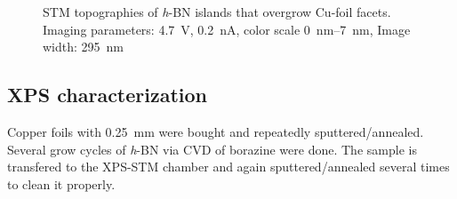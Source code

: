 	\begin{figure}[h!]
		\centering
		 \quad %
		\caption{STM topographies of \textit{h}-BN islands that overgrow Cu-foil facets. Imaging parameters: 		
			\SI{4.7}{\volt}, \SI{0.2}{\nano\ampere}, color scale \SIrange{0}{7}{\nano\meter}, Image width: \SI{295}{\nano \meter}
		}%
		\label{fig:h-bn-overgrown-cu}
	\end{figure}
\FloatBarrier

\subsection{XPS characterization}
Copper foils with \SI{0.25}{\mm} were bought and repeatedly sputtered/annealed. Several grow cycles of \textit{h}-BN via CVD of borazine were done.  The sample is transfered to the XPS-STM chamber and again sputtered/annealed several times to clean it properly.


